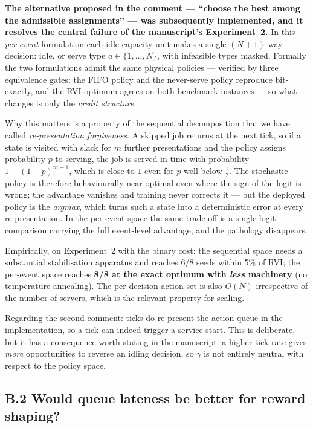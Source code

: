 \documentclass[11pt,a4paper]{article}
\begin{document}
\textbf{The alternative proposed in the comment --- ``choose the best among the
admissible assignments'' --- was subsequently implemented, and it resolves the
central failure of the manuscript's Experiment~2.}  In this
\emph{per-event} formulation each idle capacity unit makes a single
$(N{+}1)$-way decision: idle, or serve type $a \in \{1,\dots,N\}$, with
infeasible types masked.  Formally the two formulations admit the same physical
policies --- verified by three equivalence gates: the FIFO policy and the
never-serve policy reproduce bit-exactly, and the RVI optimum agrees on both
benchmark instances --- so what changes is only the \emph{credit structure}.

Why this matters is a property of the sequential decomposition that we have
called \emph{re-presentation forgiveness}.  A skipped job returns at the next
tick, so if a state is visited with slack for $m$ further presentations and the
policy assigns probability $p$ to serving, the job is served in time with
probability $1 - (1-p)^{m+1}$, which is close to $1$ even for $p$ well below
$\tfrac12$.  The stochastic policy is therefore behaviourally near-optimal even
where the sign of the logit is wrong; the advantage vanishes and training never
corrects it --- but the deployed policy is the \emph{argmax}, which turns such a
state into a deterministic error at every re-presentation.  In the per-event
space the same trade-off is a single logit comparison carrying the full
event-level advantage, and the pathology disappears.

Empirically, on Experiment~2 with the binary cost: the sequential space needs a
substantial stabilisation apparatus and reaches 6/8 seeds within 5\% of RVI; the
per-event space reaches \textbf{8/8 at the exact optimum with \emph{less}
machinery} (no temperature annealing).  The per-decision action set is also
$O(N)$ irrespective of the number of servers, which is the relevant property for
scaling.

Regarding the second comment: ticks do re-present the action queue in the
implementation, so a tick can indeed trigger a service start.  This is
deliberate, but it has a consequence worth stating in the manuscript: a higher
tick rate gives \emph{more} opportunities to reverse an idling decision, so
$\gamma$ is not entirely neutral with respect to the policy space.

\subsection*{B.2 Would queue lateness be better for reward shaping?}
\end{document}
